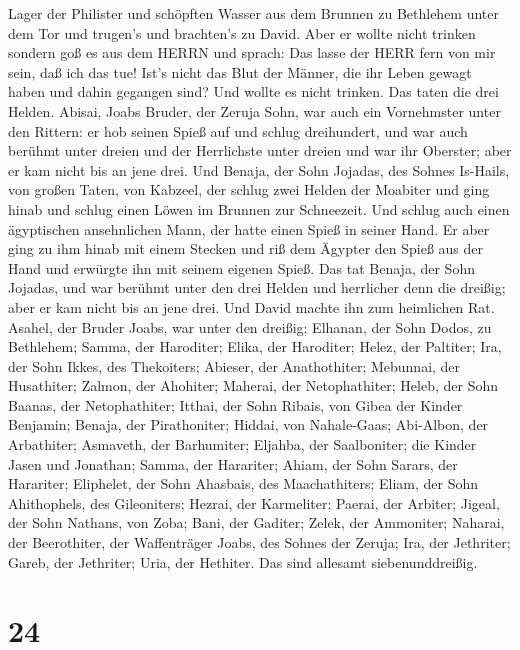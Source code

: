 Lager der Philister und schöpften Wasser aus dem Brunnen zu Bethlehem
unter dem Tor und trugen's und brachten's zu David. Aber er wollte nicht
trinken sondern goß es aus dem HERRN  und sprach: Das lasse
der HERR fern von mir sein, daß ich das tue! Ist's nicht das Blut der
Männer, die ihr Leben gewagt haben und dahin gegangen sind? Und wollte
es nicht trinken. Das taten die drei Helden.  Abisai, Joabs
Bruder, der Zeruja Sohn, war auch ein Vornehmster unter den Rittern: er
hob seinen Spieß auf und schlug dreihundert, und war auch berühmt unter
dreien  und der Herrlichste unter dreien und war ihr
Oberster; aber er kam nicht bis an jene drei.  Und Benaja,
der Sohn Jojadas, des Sohnes Is-Hails, von großen Taten, von Kabzeel,
der schlug zwei Helden der Moabiter und ging hinab und schlug einen
Löwen im Brunnen zur Schneezeit.  Und schlug auch einen
ägyptischen ansehnlichen Mann, der hatte einen Spieß in seiner Hand. Er
aber ging zu ihm hinab mit einem Stecken und riß dem Ägypter den Spieß
aus der Hand und erwürgte ihn mit seinem eigenen Spieß. 
Das tat Benaja, der Sohn Jojadas, und war berühmt unter den drei Helden
 und herrlicher denn die dreißig; aber er kam nicht bis an
jene drei. Und David machte ihn zum heimlichen Rat. 
Asahel, der Bruder Joabs, war unter den dreißig; Elhanan, der Sohn
Dodos, zu Bethlehem;  Samma, der Haroditer; Elika, der
Haroditer;  Helez, der Paltiter; Ira, der Sohn Ikkes, des
Thekoiters;  Abieser, der Anathothiter; Mebunnai, der
Husathiter;  Zalmon, der Ahohiter; Maherai, der
Netophathiter;  Heleb, der Sohn Baanas, der Netophathiter;
Itthai, der Sohn Ribais, von Gibea der Kinder Benjamin; 
Benaja, der Pirathoniter; Hiddai, von Nahale-Gaas; 
Abi-Albon, der Arbathiter; Asmaveth, der Barhumiter; 
Eljahba, der Saalboniter; die Kinder Jasen und Jonathan; 
Samma, der Harariter; Ahiam, der Sohn Sarars, der Harariter;
 Eliphelet, der Sohn Ahasbais, des Maachathiters; Eliam,
der Sohn Ahithophels, des Gileoniters;  Hezrai, der
Karmeliter; Paerai, der Arbiter;  Jigeal, der Sohn Nathans,
von Zoba; Bani, der Gaditer;  Zelek, der Ammoniter;
Naharai, der Beerothiter, der Waffenträger Joabs, des Sohnes der Zeruja;
 Ira, der Jethriter; Gareb, der Jethriter; 
Uria, der Hethiter. Das sind allesamt siebenunddreißig.

\hypertarget{section-23}{%
\section{24}\label{section-23}}

